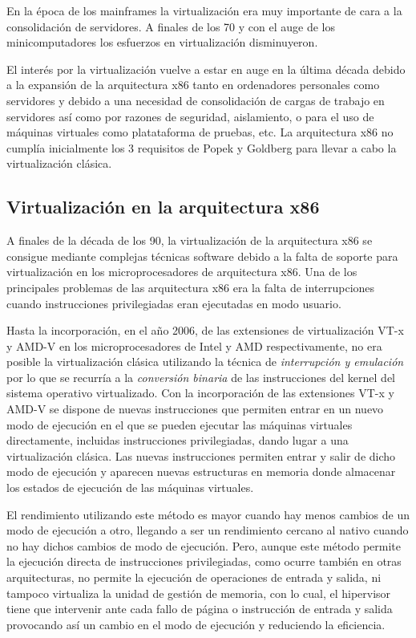 \documentclass[spanisheDIVcalc,twoside,parskip-,pointlessnumbers,final]{scrbook}
\begin{document}
En la época de los mainframes la virtualización era muy importante
de cara a la consolidación de servidores. A finales de los 70 y con
el auge de los minicomputadores los esfuerzos en virtualización disminuyeron.

El interés por la virtualización vuelve a estar en auge en la última
década debido a la expansión de la arquitectura x86 tanto en ordenadores
personales como servidores y debido a una necesidad de consolidación
de cargas de trabajo en servidores así como por razones de seguridad,
aislamiento, o para el uso de máquinas virtuales como platataforma
de pruebas, etc. La arquitectura x86 no cumplía inicialmente los 3
requisitos de Popek y Goldberg para llevar a cabo la virtualización
clásica.


\subsection{Virtualización en la arquitectura x86}

A finales de la década de los 90, la virtualización de la arquitectura
x86 se consigue mediante complejas técnicas software debido a la falta
de soporte para virtualización en los microprocesadores de arquitectura
x86. Una de los principales problemas de las arquitectura x86 era
la falta de interrupciones cuando instrucciones privilegiadas eran
ejecutadas en modo usuario. 

Hasta la incorporación, en el año 2006, de las extensiones de virtualización
VT-x y AMD-V en los microprocesadores de Intel y AMD respectivamente,
no era posible la virtualización clásica utilizando la técnica de
\emph{interrupción y emulación }por lo que se recurría a la \emph{conversión
binaria }de las instrucciones del kernel del sistema operativo virtualizado.
Con la incorporación de las extensiones VT-x y AMD-V se dispone de
nuevas instrucciones que permiten entrar en un nuevo modo de ejecución
en el que se pueden ejecutar las máquinas virtuales directamente,
incluidas instrucciones privilegiadas, dando lugar a una virtualización
clásica. Las nuevas instrucciones permiten entrar y salir de dicho
modo de ejecución y aparecen nuevas estructuras en memoria donde almacenar
los estados de ejecución de las máquinas virtuales.

El rendimiento utilizando este método es mayor cuando hay menos cambios
de un modo de ejecución a otro, llegando a ser un rendimiento cercano
al nativo cuando no hay dichos cambios de modo de ejecución. Pero,
aunque este método permite la ejecución directa de instrucciones privilegiadas,
como ocurre también en otras arquitecturas, no permite la ejecución
de operaciones de entrada y salida, ni tampoco virtualiza la unidad
de gestión de memoria, con lo cual, el hipervisor tiene que intervenir
ante cada fallo de página o instrucción de entrada y salida provocando
así un cambio en el modo de ejecución y reduciendo la eficiencia.
\end{document}
